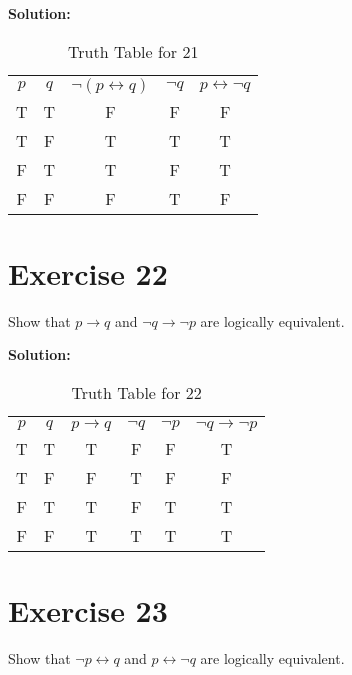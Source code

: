 \documentclass{Axon}
\begin{document}
\noindent
\textbf{Solution:}
\begin{table}[ht]
    \centering
    \begin{tabular}{c|c|c|c|c}
        \(p\) & \(q\) & \(\lnot(p \leftrightarrow q)\) & \(\lnot q\) & \(p \leftrightarrow \lnot q\) \\
        T     & T     & F                              & F           & F                             \\
        T     & F     & T                              & T           & T                             \\
        F     & T     & T                              & F           & T                             \\
        F     & F     & F                              & T           & F
    \end{tabular}
    \caption{Truth Table for 21}
\end{table}

\section*{Exercise 22}
Show that \(p \to q\) and \(\lnot q \to \lnot p\) are logically equivalent.

\noindent
\textbf{Solution:}
\begin{table}[ht]
    \centering
    \begin{tabular}{c|c|c|c|c|c}
        \(p\) & \(q\) & \(p \to q\) & \(\lnot q\) & \(\lnot p\) & \(\lnot q \to \lnot p\) \\
        T     & T     & T           & F           & F           & T                       \\
        T     & F     & F           & T           & F           & F                       \\
        F     & T     & T           & F           & T           & T                       \\
        F     & F     & T           & T           & T           & T
    \end{tabular}
    \caption{Truth Table for 22}
\end{table}

\section*{Exercise 23}
Show that \(\lnot p \leftrightarrow q\) and \(p \leftrightarrow \lnot q\) are logically equivalent.
\end{document}
